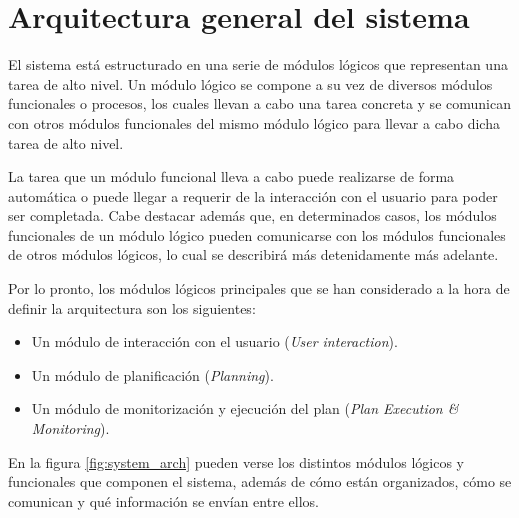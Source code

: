 
\chapter{Arquitectura general del sistema}
\label{chap:arch}

El sistema está estructurado en una serie de módulos lógicos que representan una
tarea de alto nivel. Un módulo lógico se compone a su vez de diversos módulos
funcionales o procesos, los cuales llevan a cabo una tarea concreta y se comunican con
otros módulos funcionales del mismo módulo lógico para llevar a cabo dicha tarea de alto
nivel.

La tarea que un módulo funcional lleva a cabo puede realizarse de forma automática o
puede llegar a requerir de la interacción con el usuario para poder ser completada.
Cabe destacar además que, en determinados casos, los módulos funcionales de un módulo
lógico pueden comunicarse con los módulos funcionales de otros módulos lógicos, lo cual se
describirá más detenidamente más adelante.

Por lo pronto, los módulos lógicos principales que se han considerado a la hora de definir
la arquitectura son los siguientes:

\begin{itemize}[label=\textbullet]
    \item Un módulo de interacción con el usuario (\textit{User interaction}).
    \item Un módulo de planificación (\textit{Planning}).
    \item Un módulo de monitorización y ejecución del plan (\textit{Plan Execution \& Monitoring}).
\end{itemize}

En la figura \ref{fig:system_arch} pueden verse los distintos módulos lógicos y funcionales que
componen el sistema, además de cómo están organizados, cómo se comunican y qué información se
envían entre ellos.

